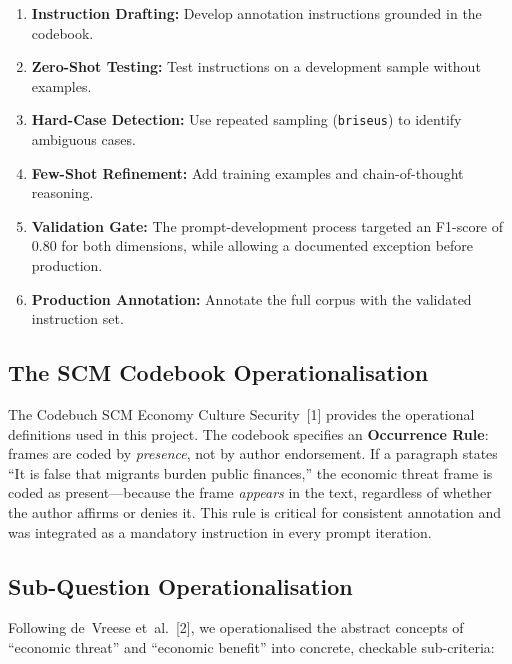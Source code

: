 \begin{enumerate}
    \item \textbf{Instruction Drafting:} Develop annotation instructions grounded in the codebook.
    \item \textbf{Zero-Shot Testing:} Test instructions on a development sample without examples.
    \item \textbf{Hard-Case Detection:} Use repeated sampling (\texttt{briseus}) to identify ambiguous cases.
    \item \textbf{Few-Shot Refinement:} Add training examples and chain-of-thought reasoning.
    \item \textbf{Validation Gate:} The prompt-development process targeted an F1-score of 0.80 for both dimensions, while allowing a documented exception before production.
    \item \textbf{Production Annotation:} Annotate the full corpus with the validated instruction set.
\end{enumerate}

\subsection{The SCM Codebook Operationalisation}

The Codebuch SCM Economy Culture Security~[1] provides the operational definitions used in this project. The codebook specifies an \textbf{Occurrence Rule}: frames are coded by \textit{presence}, not by author endorsement. If a paragraph states ``It is false that migrants burden public finances,'' the economic threat frame is coded as present---because the frame \textit{appears} in the text, regardless of whether the author affirms or denies it. This rule is critical for consistent annotation and was integrated as a mandatory instruction in every prompt iteration.

\subsection{Sub-Question Operationalisation}

Following de~Vreese et~al.~[2], we operationalised the abstract concepts of ``economic threat'' and ``economic benefit'' into concrete, checkable sub-criteria:

